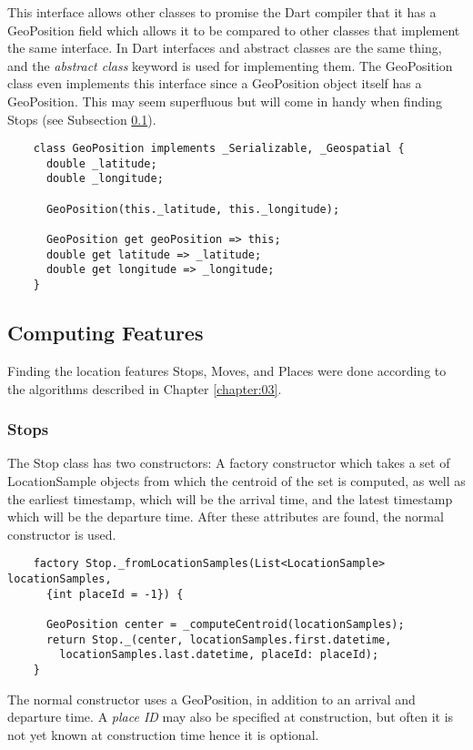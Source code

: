This interface allows other classes to promise the Dart compiler that it has a GeoPosition field which allows it to be compared to other classes that implement the same interface. In Dart interfaces and abstract classes are the same thing, and the \textit{abstract class} keyword is used for implementing them. The GeoPosition class even implements this interface since a GeoPosition object itself has a GeoPosition. This may seem superfluous but will come in handy when finding Stops (see Subsection \ref{subsection:finding-features}).

\begin{verbatim}
    class GeoPosition implements _Serializable, _Geospatial {
      double _latitude;
      double _longitude;
    
      GeoPosition(this._latitude, this._longitude);
    
      GeoPosition get geoPosition => this;
      double get latitude => _latitude;
      double get longitude => _longitude;
    }
\end{verbatim}


\subsection{Computing Features}
\label{subsection:finding-features}
Finding the location features Stops, Moves, and Places  were done according to the algorithms described in Chapter \ref{chapter:03}. 

\subsubsection*{Stops}
The Stop class has two constructors: A factory constructor which takes a set of LocationSample objects from which the centroid of the set is computed, as well as the earliest timestamp, which will be the arrival time, and the latest timestamp which will be the departure time. After these attributes are found, the normal constructor is used.

\begin{verbatim}
    factory Stop._fromLocationSamples(List<LocationSample> locationSamples,
      {int placeId = -1}) {
      
      GeoPosition center = _computeCentroid(locationSamples);
      return Stop._(center, locationSamples.first.datetime,
        locationSamples.last.datetime, placeId: placeId);
    }
\end{verbatim}

The normal constructor uses a GeoPosition, in addition to an arrival and departure time. A \textit{place ID }may also be specified at construction, but often it is not yet known at construction time hence it is optional.

